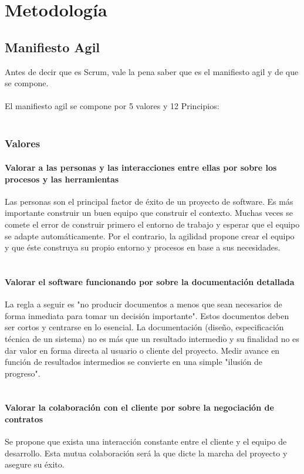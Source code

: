 \chapter{Metodología}
\section{Manifiesto Agil}
Antes de decir que es Scrum, vale la pena saber que es el manifiesto agil y de que se compone.
\\
\\
El manifiesto agil se compone por 5 valores y 12 Principios:
\\
\\
\subsection{Valores}
\subsubsection{Valorar a las personas y las interacciones entre ellas por sobre los procesos y las herramientas}
Las personas son el principal factor de éxito de un proyecto de software. Es más importante construir un buen equipo que construir el contexto. Muchas veces se comete el error de construir primero el entorno de trabajo y esperar que el equipo se adapte automáticamente. Por el contrario, la agilidad propone crear el equipo y que éste construya su propio entorno y procesos en base a sus necesidades.
\\
\\
\subsubsection{Valorar        el   software       funcionando        por     sobre      la 
	documentación detallada} 
La regla a seguir es "no producir documentos a menos que sean 
necesarios      de    forma     inmediata      para    tomar     un   decisión 
importante". Estos documentos deben ser cortos y centrarse en 
lo esencial. La documentación (diseño, especificación técnica de 
un sistema) no es más que un resultado intermedio y su finalidad 
no    es  dar   valor   en   forma    directa   al   usuario   o   cliente   del 
proyecto. Medir avance en función de resultados intermedios se 
convierte en una simple "ilusión de progreso". 
\\
\\
\subsubsection{Valorar      la   colaboración      con    el   cliente   por    sobre    la 
	negociación de contratos}
Se propone que exista una interacción constante entre el cliente 
y el equipo de desarrollo. Esta mutua colaboración                será la que 
dicte la marcha del proyecto y asegure su éxito. 
\\
\\
